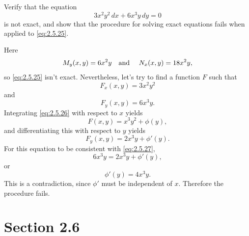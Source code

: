 \setcounter{example}{4}
\setcounter{equation}{24}
\begin{example}
  \label{example:2.5.5} \rm Verify that the equation
  \begin{equation}
    \label{eq:2.5.25}3x^{2}y^{2}\,dx+6x^{3}y\,dy=0
  \end{equation}
  is not exact, and show that the procedure for solving exact equations fails when applied to
  \eqref{eq:2.5.25}.
\end{example}
\setcounter{equation}{25}
\begin{examplesolution}
\solution Here
\[
  M_{y}(x,y)=6x^{2}y\mbox{\quad and \quad }N_{x}(x,y)=18x^{2}y,
\]
so \eqref{eq:2.5.25} isn't exact. Nevertheless, let's try to find a function $F$ such that
\begin{equation}
  \label{eq:2.5.26}F_{x}(x,y)=3x^{2}y^{2}
\end{equation}
and
\begin{equation}
  \label{eq:2.5.27}F_{y}(x,y)=6x^{3}y.
\end{equation}
Integrating \eqref{eq:2.5.26} with respect to $x$ yields
\[
  F(x,y)=x^{3}y^{2}+\phi(y),
\]
and differentiating this with respect to $y$ yields
\[
  F_{y}(x,y)=2x^{3}y+\phi'(y).
\]
For this equation to be consistent with \eqref{eq:2.5.27},
\[
  6x^{3}y=2x^{3}y+\phi'(y),
\]
or
\[
  \phi'(y)=4x^{3}y.
\]
This is a contradiction, since $\phi'$ must be independent of $x$. Therefore the procedure fails.
\end{examplesolution}

\section*{Section 2.6}
\setcounter{chapter}{2}
\setcounter{section}{6}

